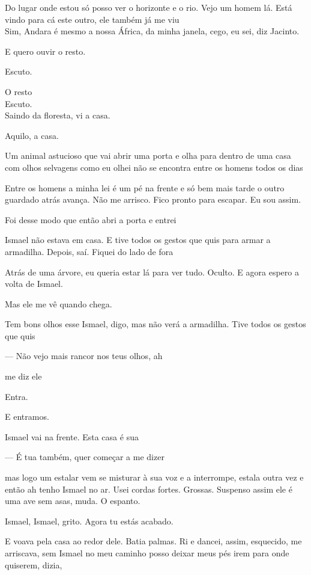Do lugar onde estou só posso ver o horizonte e o rio. Vejo um homem lá.
Está vindo para cá este outro, ele também já me viu\\

Sim, Andara é mesmo a nossa África, da minha janela, cego, eu sei, diz
Jacinto.

E quero ouvir o resto.

Escuto.

O resto\\

Escuto.\\

Saindo da floresta, vi a casa.

Aquilo, a casa.

Um animal astucioso que vai abrir uma porta e olha para dentro de uma
casa com olhos selvagens como eu olhei não se encontra entre os homens
todos os dias

Entre os homens a minha lei é um pé na frente e só bem mais tarde o
outro guardado atrás avança. Não me arrisco. Fico pronto para escapar.
Eu sou assim.

Foi desse modo que então abri a porta e entrei

Ismael não estava em casa. E tive todos os gestos que quis para armar a
armadilha. Depois, saí. Fiquei do lado de fora

Atrás de uma árvore, eu queria estar lá para ver tudo. Oculto. E agora
espero a volta de Ismael.

Mas ele me vê quando chega.

Tem bons olhos esse Ismael, digo, mas não verá a armadilha. Tive todos
os gestos que quis

--- Não vejo mais rancor nos teus olhos, ah

me diz ele

Entra.

E entramos.

Ismael vai na frente. Esta casa é sua

--- É tua também, quer começar a me dizer

mas logo um estalar vem se misturar à sua voz e a interrompe, estala
outra vez e então ah tenho Ismael no ar. Usei cordas fortes. Grossas.
Suspenso assim ele é uma ave sem asas, muda. O espanto.

Ismael, Ismael, grito. Agora tu estás acabado.

E voava pela casa ao redor dele. Batia palmas. Ri e dancei, assim,
esquecido, me arriscava, sem Ismael no meu caminho posso deixar meus pés
irem para onde quiserem, dizia,

